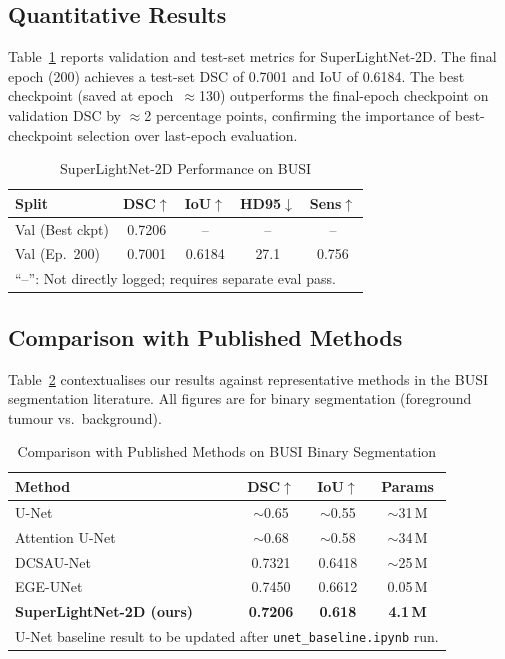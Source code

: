 \documentclass[conference]{IEEEtran}
\begin{document}
\subsection{Quantitative Results}

Table~\ref{tab:results} reports validation and test-set metrics for
SuperLightNet-2D. The final epoch (200) achieves a test-set
DSC of 0.7001 and IoU of 0.6184. The best checkpoint (saved at
epoch~$\approx$130) outperforms the final-epoch checkpoint on
validation DSC by $\approx$2 percentage points, confirming the
importance of best-checkpoint selection over last-epoch evaluation.

\begin{table}[h]
\centering
\caption{SuperLightNet-2D Performance on BUSI}
\label{tab:results}
\begin{tabular}{lcccc}
\toprule
\textbf{Split} & \textbf{DSC}$\uparrow$ & \textbf{IoU}$\uparrow$
               & \textbf{HD95}$\downarrow$ & \textbf{Sens}$\uparrow$ \\
\midrule
Val (Best ckpt) & 0.7206 & -- & -- & -- \\
Val (Ep.\ 200)  & 0.7001 & 0.6184 & 27.1 & 0.756 \\
\bottomrule
\multicolumn{5}{l}{\small{``--'': Not directly logged; requires separate eval pass.}}
\end{tabular}
\end{table}

\subsection{Comparison with Published Methods}

Table~\ref{tab:sota} contextualises our results against representative
methods in the BUSI segmentation literature. All figures are for
binary segmentation (foreground tumour vs.\ background).

\begin{table}[h]
\centering
\caption{Comparison with Published Methods on BUSI Binary Segmentation}
\label{tab:sota}
\begin{tabular}{lccc}
\toprule
\textbf{Method} & \textbf{DSC}$\uparrow$ & \textbf{IoU}$\uparrow$
                & \textbf{Params} \\
\midrule
U-Net~\cite{ronneberger2015u}
  & $\sim$0.65 & $\sim$0.55 & $\sim$31\,M \\
Attention U-Net~\cite{oktay2018attention}
  & $\sim$0.68 & $\sim$0.58 & $\sim$34\,M \\
DCSAU-Net~\cite{xu2023dcsau}
  & 0.7321 & 0.6418 & $\sim$25\,M \\
EGE-UNet~\cite{wu2023ege}
  & 0.7450 & 0.6612 & 0.05\,M \\
\textbf{SuperLightNet-2D (ours)}~\cite{yu2025superlightnet}
  & \textbf{0.7206} & \textbf{0.618} & \textbf{4.1\,M} \\
\bottomrule
\multicolumn{4}{l}{\small{U-Net baseline result to be updated after
  \texttt{unet\_baseline.ipynb} run.}}
\end{tabular}
\end{table}
\end{document}
